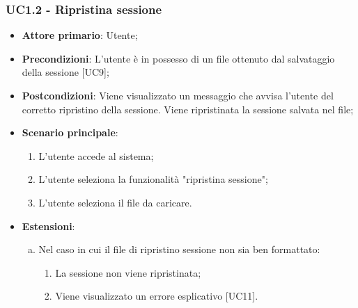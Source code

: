 \subsubsection{UC1.2 - Ripristina sessione}

\begin{itemize}
	\item \textbf{Attore primario}: Utente;
	\item \textbf{Precondizioni}: L'utente è in possesso di un file  ottenuto dal salvataggio della sessione [UC9];
	\item \textbf{Postcondizioni}: Viene visualizzato un messaggio che avvisa l'utente del corretto ripristino della sessione. Viene ripristinata la sessione salvata nel file;
	\item \textbf{Scenario principale}:
		\begin{enumerate}
			\item L'utente accede al sistema;
			\item L'utente seleziona la funzionalità "ripristina sessione";
			\item L'utente seleziona il file da caricare.
		\end{enumerate}
	\item \textbf{Estensioni}:
	\begin{enumerate}[(a)]
		\item Nel caso in cui il file di ripristino sessione non sia ben formattato:
		\begin{enumerate}[1.]
			\item La sessione non viene ripristinata;
			\item Viene visualizzato un errore esplicativo [UC11].
		\end{enumerate}
	\end{enumerate}
\end{itemize}

